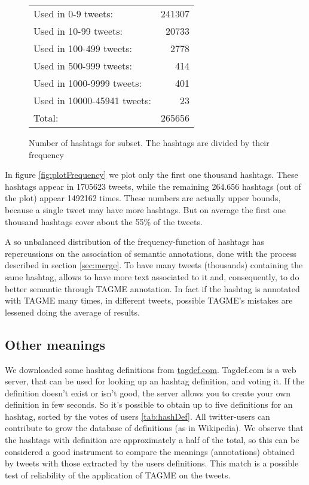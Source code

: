 \documentclass[a4paper,11pt,oneside]{article}
\begin{document}
\begin{figure}[h]
\centering
\small
\begin{tabular}[b]{l | r}
Used in 0-9 tweets:         & 241307 \\ %
Used in 10-99 tweets:       &  20733 \\ %
Used in 100-499 tweets:     &   2778 \\ %
Used in 500-999 tweets:     &    414 \\ %
Used in 1000-9999 tweets:   &    401 \\ %
Used in 10000-45941 tweets: &     23 \\ \hline
Total:	                      & 265656 \\
\end{tabular}
\caption{Number of hashtags for subset. The hashtags are divided by their frequency}
\end{figure}


In figure \ref{fig:plotFrequency} we plot only the first one thousand hashtags. These hashtags appear in 1705623 tweets, while the remaining 264.656 hashtags (out of the plot) appear 1492162 times.
These numbers are actually upper bounds, because a single tweet may have more hashtags. But on average the first one thousand hashtags cover about the 55\% of the tweets.

A so unbalanced distribution of the frequency-function of hashtags has repercussions on the association of semantic annotations, done with the process described in section \ref{sec:merge}.
To have many tweets (thousands) containing the same hashtag, allows to have more text associated to it and, consequently, to do better semantic through TAGME annotation.
In fact if the hashtag is annotated with TAGME many times, in different tweets, possible TAGME's mistakes are lessened doing the average of results.



\subsection{Other meanings}
We downloaded some hashtag definitions from \href{http://tagdef.com/}{tagdef.com}. Tagdef.com is a web server, that can be used for looking up an hashtag definition, and voting it.
If the definition doesn't exist or isn't good, the server allows you to create your own definition in few seconds. So it's possible to obtain up to five definitions for an hashtag, sorted by the votes of users \ref{tab:hashDef}. All twitter-users can contribute to grow the database of definitions (as in Wikipedia).
We observe that the hashtags with definition are approximately a half of the total, so this can be considered a good instrument to compare the meanings (annotations) obtained by tweets with those extracted by the users definitions.
This match is a possible test of reliability of the application of TAGME on the tweets. %
\end{document}
